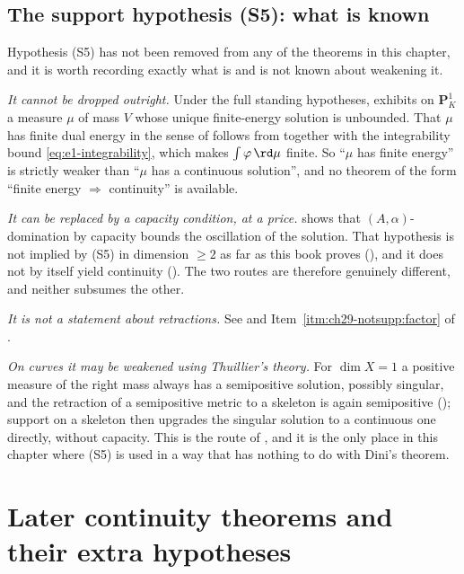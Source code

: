 \subsection{The support hypothesis \textup{(S5)}: what is known}
\label{sec:ch29-support-status}

Hypothesis \textup{(S5)} has not been removed from any of the theorems in
this chapter, and it is worth recording exactly what is and is not known
about weakening it.

\emph{It cannot be dropped outright.}  Under the full standing hypotheses,
 exhibits on \(\mathbf P^1_K\) a
measure \(\mu\) of mass \(V\) whose unique finite-energy solution is
unbounded.  That \(\mu\) has finite dual energy in the sense of
 follows from
 together with the
integrability bound \eqref{eq:e1-integrability}, which makes
\(\int\varphi\,\rd\mu\) finite.  So ``\(\mu\) has finite energy'' is
strictly weaker than ``\(\mu\) has a continuous solution'', and no theorem
of the form ``finite energy \(\Rightarrow\) continuity'' is available.

\emph{It can be replaced by a capacity condition, at a price.}
 shows that
\((A,\alpha)\)-domination by capacity bounds the oscillation of the
solution.  That hypothesis is not implied by \textup{(S5)} in dimension
\(\geq2\) as far as this book proves
(), and it does not by itself yield continuity
().  The two routes are therefore genuinely
different, and neither subsumes the other.

\emph{It is not a statement about retractions.}  See
 and
Item~\cref{itm:ch29-notsupp:factor} of .

\emph{On curves it may be weakened using Thuillier's theory.}  For
\(\dim X=1\) a positive measure of the right mass always has a semipositive
solution, possibly singular, and the retraction of a semipositive metric to
a skeleton is again semipositive
(); support on a skeleton then upgrades
the singular solution to a continuous one directly, without capacity.  This
is the route of , and it is the
only place in this chapter where \textup{(S5)} is used in a way that has
nothing to do with Dini's theorem.

\section{Later continuity theorems and their extra hypotheses}
\label{sec:ch29-later}


